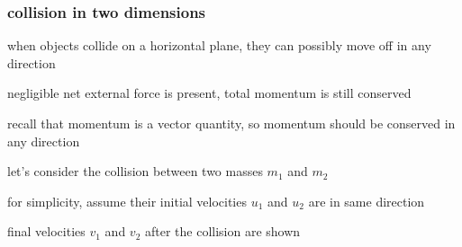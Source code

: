 \subsubsection{collision in two dimensions}

when objects collide on a horizontal plane, they can possibly move off in any direction

negligible net external force is present, total momentum is still conserved

recall that momentum is a vector quantity, so momentum should be conserved in any direction

\vspace*{\baselineskip}

let's consider the collision between two masses $m_1$ and $m_2$

for simplicity, assume their initial velocities $u_1$ and $u_2$ are in same direction

final velocities $v_1$ and $v_2$ after the collision are shown

